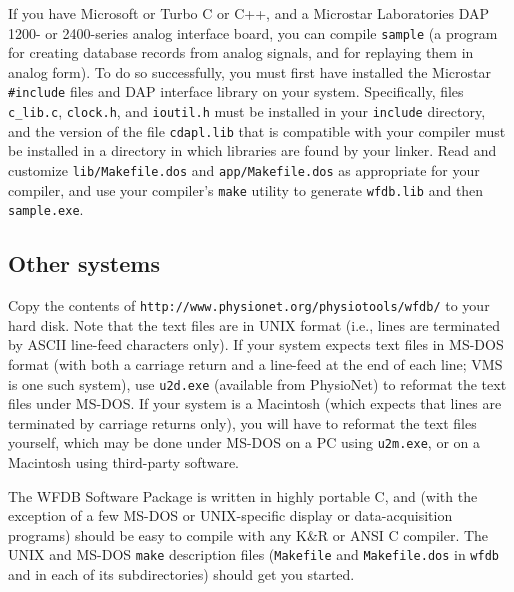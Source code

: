\documentclass[twoside]{article}
\begin{document}
If you have Microsoft or Turbo C or C++, and a Microstar Laboratories DAP 1200-
or 2400-series analog interface board, you can compile {\tt sample} (a program
for creating database records from analog signals, and for replaying them in
analog form).  To do so successfully, you must first have installed the
Microstar {\tt \#include} files and DAP interface library on your system.
Specifically, files {\tt c\_lib.c}, {\tt clock.h}, and {\tt ioutil.h} must be
installed in your {\tt include} directory, and the version of the file
{\tt cdapl.lib} that is compatible with your compiler must be installed in a
directory in which libraries are found by your linker.  Read and customize
{\tt lib/Makefile.dos} and {\tt app/Makefile.dos} as appropriate for your
compiler, and use your compiler's {\tt make} utility to generate {\tt wfdb.lib}
and then {\tt sample.exe}.

\subsection*{Other systems}

Copy the contents of {\tt http://www.\-physio\-net.\-org/physio\-tools/wfdb/}
to your hard disk.  Note that the text files are in UNIX format (i.e., lines
are terminated by ASCII line-feed characters only).  If your system expects
text files in MS-DOS format (with both a carriage return and a line-feed at the
end of each line; VMS is one such system), use {\tt u2d.exe} (available from
PhysioNet) to reformat the text files under MS-DOS.  If your system is a
Macintosh (which expects that lines are terminated by carriage returns only),
you will have to reformat the text files yourself, which may be done under
MS-DOS on a PC using {\tt u2m.exe}, or on a Macintosh using third-party
software.

The WFDB Software Package is written in highly portable C, and (with the
exception of a few MS-DOS or UNIX-specific display or data-acquisition
programs) should be easy to compile with any K\&R or ANSI C compiler.
The UNIX and MS-DOS {\tt make} description files ({\tt Makefile}
and {\tt Makefile.dos} in {\tt wfdb} and in each of its subdirectories)
should get you started.
\end{document}

